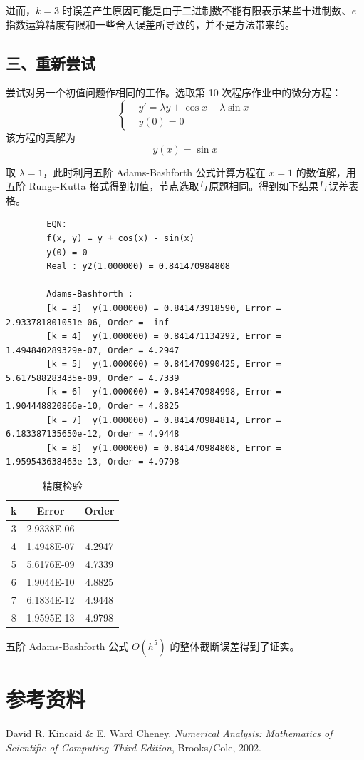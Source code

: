 \documentclass{ctexart}
\begin{document}
		进而，$k = 3$ 时误差产生原因可能是由于二进制数不能有限表示某些十进制数、$e$ 指数运算精度有限和一些舍入误差所导致的，并不是方法带来的。
		
		
	\subsection*{三、重新尝试}
	\noindent 尝试对另一个初值问题作相同的工作。选取第 10 次程序作业中的微分方程：
	\begin{equation}
	\left\{\begin{aligned}
		& y' = \lambda y + \cos x - \lambda \sin x\\
		& y(0) = 0
	\end{aligned}\right.
	\end{equation}
	该方程的真解为
	\begin{equation}
		y(x) = \sin x
	\end{equation}
	
	取 $\lambda = 1$，此时利用五阶 Adams-Bashforth 公式计算方程在 $x = 1$ 的数值解，用五阶 Runge-Kutta 格式得到初值，节点选取与原题相同。得到如下结果与误差表格。
	\begin{verbatim}
		EQN:
		f(x, y) = y + cos(x) - sin(x)
		y(0) = 0
		Real : y2(1.000000) = 0.841470984808
		
		Adams-Bashforth :
		[k = 3]  y(1.000000) = 0.841473918590, Error = 2.933781801051e-06, Order = -inf
		[k = 4]  y(1.000000) = 0.841471134292, Error = 1.494840289329e-07, Order = 4.2947
		[k = 5]  y(1.000000) = 0.841470990425, Error = 5.617588283435e-09, Order = 4.7339
		[k = 6]  y(1.000000) = 0.841470984998, Error = 1.904448820866e-10, Order = 4.8825
		[k = 7]  y(1.000000) = 0.841470984814, Error = 6.183387135650e-12, Order = 4.9448
		[k = 8]  y(1.000000) = 0.841470984808, Error = 1.959543638463e-13, Order = 4.9798
	\end{verbatim}
	
	\begin{table}[htb]
		\centering
		\bigskip
		\begin{small}
			\begin{tabular}{|c|cc|}
				\hline
					k & Error & Order\\
				\hline
					3 & 2.9338E-06 & -- \\
					4 & 1.4948E-07 & 4.2947 \\
					5 & 5.6176E-09 & 4.7339 \\
					6 & 1.9044E-10 & 4.8825 \\
					7 & 6.1834E-12 & 4.9448 \\
					8 & 1.9595E-13 & 4.9798 \\
				\hline
			\end{tabular}
		\end{small}
		\caption{\label{table.label} 精度检验}
	\end{table}
	
	五阶 Adams-Bashforth 公式 $O(h^5)$ 的整体截断误差得到了证实。

\section*{参考资料}
	\noindent [1] David R. Kincaid \& E. Ward Cheney. {\it Numerical Analysis: Mathematics of Scientific of Computing Third Edition}, Brooks/Cole, 2002.
\end{document}
